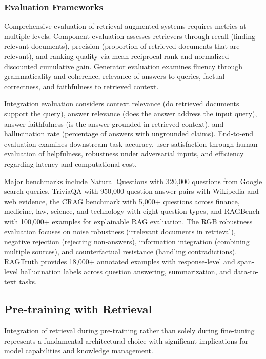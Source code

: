 \documentclass[11pt,letterpaper]{article}
\begin{document}
\subsubsection{Evaluation Frameworks}

Comprehensive evaluation of retrieval-augmented systems requires metrics at multiple levels. Component evaluation assesses retrievers through recall (finding relevant documents), precision (proportion of retrieved documents that are relevant), and ranking quality via mean reciprocal rank and normalized discounted cumulative gain. Generator evaluation examines fluency through grammaticality and coherence, relevance of answers to queries, factual correctness, and faithfulness to retrieved context.

Integration evaluation considers context relevance (do retrieved documents support the query), answer relevance (does the answer address the input query), answer faithfulness (is the answer grounded in retrieved context), and hallucination rate (percentage of answers with ungrounded claims). End-to-end evaluation examines downstream task accuracy, user satisfaction through human evaluation of helpfulness, robustness under adversarial inputs, and efficiency regarding latency and computational cost.

Major benchmarks include Natural Questions with 320,000 questions from Google search queries, TriviaQA with 950,000 question-answer pairs with Wikipedia and web evidence, the CRAG benchmark with 5,000+ questions across finance, medicine, law, science, and technology with eight question types, and RAGBench with 100,000+ examples for explainable RAG evaluation. The RGB robustness evaluation focuses on noise robustness (irrelevant documents in retrieval), negative rejection (rejecting non-answers), information integration (combining multiple sources), and counterfactual resistance (handling contradictions). RAGTruth provides 18,000+ annotated examples with response-level and span-level hallucination labels across question answering, summarization, and data-to-text tasks.

\subsection{Pre-training with Retrieval}

Integration of retrieval during pre-training rather than solely during fine-tuning represents a fundamental architectural choice with significant implications for model capabilities and knowledge management.
\end{document}
